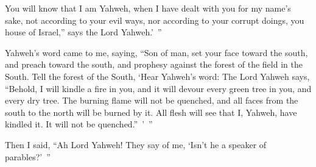 {You will know that I am Yahweh, when I have dealt with you for my name’s sake, not according to your evil ways, nor according to your corrupt doings, you house of Israel,” says the Lord Yahweh.’ ”
\par }{\PP {}Yahweh’s word came to me, saying,
“Son of man, set your face toward the south, and preach toward the south, and prophesy against the forest of the field in the South.
Tell the forest of the South, ‘Hear Yahweh’s word: The Lord Yahweh says, “Behold, I will kindle a fire in you, and it will devour every green tree in you, and every dry tree. The burning flame will not be quenched, and all faces from the south to the north will be burned by it.
All flesh will see that I, Yahweh, have kindled it. It will not be quenched.” ’ ”
\par }{\PP {}Then I said, “Ah Lord Yahweh! They say of me, ‘Isn’t he a speaker of parables?’ ”

}

